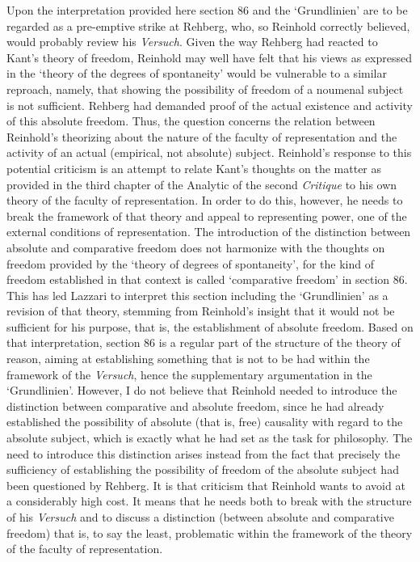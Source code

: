 Upon the interpretation provided here section 86 and the `Grundlinien' are to be regarded as a pre{-}emptive strike at Rehberg, who, so Reinhold correctly believed, would probably review his \textit{Versuch}. Given the way Rehberg had reacted to Kant's theory of freedom, Reinhold may well have felt that his views as expressed in the `theory of the degrees of spontaneity' would be vulnerable to a similar reproach, namely, that showing the possibility of freedom of a noumenal subject is not sufficient. Rehberg had demanded proof of the actual existence and activity of this absolute freedom. Thus, the question concerns the relation between Reinhold's theorizing about the nature of the faculty of representation and the activity of an actual (empirical, not absolute) subject. Reinhold's response to this potential criticism is an attempt to relate Kant's thoughts on the matter as provided in the third chapter of the Analytic of the second \textit{Critique} to his own theory of the faculty of representation. In order to do this, however, he needs to break the framework of that theory and appeal to representing power, one of the external conditions of representation. The introduction of the distinction between absolute and comparative freedom does not harmonize with the thoughts on freedom provided by the `theory of degrees of spontaneity', for the kind of freedom established in that context is called `comparative freedom' in section 86. This has led Lazzari to interpret this section including the `Grundlinien' as a revision of that theory, stemming from Reinhold's insight that it would not be sufficient for his purpose, that is, the establishment of absolute freedom. Based on that interpretation, section 86 is a regular part of the structure of the theory of reason, aiming at establishing something that is not to be had within the framework of the \textit{Versuch}, hence the supplementary argumentation in the `Grundlinien'. However, I do not believe that Reinhold needed to introduce the distinction between comparative and absolute freedom, since he had already established the possibility of absolute (that is, free) causality with regard to the absolute subject, which is exactly what he had set as the task for philosophy. The need to introduce this distinction arises instead from the fact that precisely the sufficiency of establishing the possibility of freedom of the absolute subject had been questioned by Rehberg. It is that criticism that Reinhold wants to avoid at a considerably high cost. It means that he needs both to break with the structure of his \textit{Versuch} and to discuss a distinction (between absolute and comparative freedom) that is, to say the least, problematic within the framework of the theory of the faculty of representation. 

